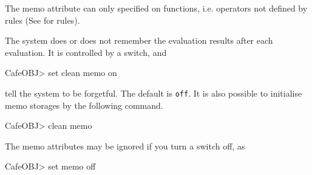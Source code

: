 \documentclass[a4paper]{memoir}
\begin{document}
The memo attribute can only specified on functions, i.e. operators
not defined by rules (See \label{sec:p2-rule-declaration} for rules).

The system does or does not remember the evaluation results
after each evaluation. It is controlled by a switch, and
\begin{vvtm}
\begin{ccode}
  CafeOBJ> set clean memo on
\end{ccode}
\end{vvtm}
tell the system to be forgetful. The default is \verb|off|.
It is also possible to initialise memo storages by the following command.
\begin{vvtm}
\begin{ccode}
  CafeOBJ> clean memo
\end{ccode}
\end{vvtm}

The memo attributes may be ignored if you turn a switch off,
as
\begin{vvtm}
\begin{ccode}
  CafeOBJ> set memo off
\end{ccode}
\end{vvtm}
%
%
%
%
%
%
\end{document}
